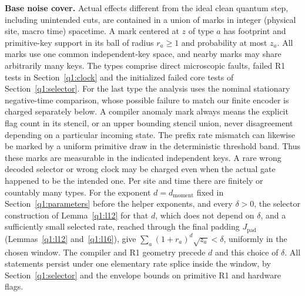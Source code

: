 \textbf{Base noise cover.} Actual effects different from the ideal clean quantum step, including unintended cuts, are contained in a union of marks in integer (physical site, macro time) spacetime. A mark centered at \(z\) of type \(a\) has footprint and primitive-key support in its ball of radius \(r_{a}\ge 1\) and probability at most \(z_{a}\). All marks use one common independent-key space, and nearby marks may share arbitrarily many keys. The types comprise direct microscopic faults, failed R1 tests in Section~\ref{q1:clock} and the initialized failed core tests of Section~\ref{q1:selector}. For the last type the analysis uses the nominal stationary negative-time comparison, whose possible failure to match our finite encoder is charged separately below. A compiler anomaly mark always means the explicit flag count in its stencil, or an upper bounding stencil union, never disagreement depending on a particular incoming state. The prefix rate mismatch can likewise be marked by a uniform primitive draw in the deterministic threshold band. Thus these marks are measurable in the indicated independent keys. A rare wrong decoded selector or wrong clock may be charged even when the actual gate happened to be the intended one. Per site and time there are finitely or countably many types. For the exponent \(d=d_{\mathrm{moment}}\) fixed in Section~\ref{q1:parameters} before the helper exponents, and every \(\delta>0\), the selector construction of Lemma~\ref{q1:l12} for that \(d\), which does not depend on \(\delta\), and a sufficiently small selected rate, reached through the final padding \(J_{\mathrm{pad}}\) (Lemmas~\ref{q1:l12} and~\ref{q1:l16}), give \(\sum _{a} (1+r_{a})^{d} \sqrt{z_{a}}<\delta\), uniformly in the chosen window. The compiler and R1 geometry precede \(d\) and this choice of \(\delta\). All statements persist under one elementary rate splice inside the window, by Section~\ref{q1:selector} and the envelope bounds on primitive R1 and hardware flags.

